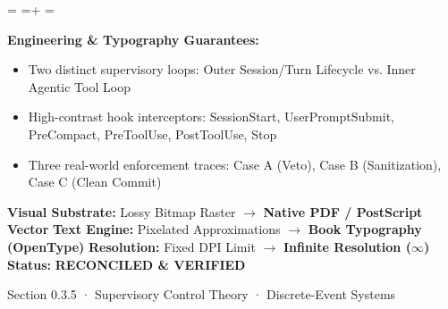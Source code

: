 \documentclass[10pt,a4paper,landscape]{article}
\newcommand{\pdautoscale}[2]{%
  \pdmaxh=#1\relax
  \pdmaxw=#2\relax
  \sbox{\pdscaledbox}{\usebox{\pdfigbox}}%
  \pdcurh=\dimexpr\ht\pdscaledbox+\dp\pdscaledbox\relax
  \pdcurw=\wd\pdscaledbox
  \ifdim\dimexpr\pdcurw * 100 / \pdmaxw\relax > \dimexpr\pdcurh * 100 / \pdmaxh\relax
    \resizebox{\pdmaxw}{!}{\usebox{\pdscaledbox}}%
  \else
    \resizebox{!}{\pdmaxh}{\usebox{\pdscaledbox}}%
  \fi
}
\begin{document}
\begin{minipage}[t]{0.492\linewidth}
  \begin{tcolorbox}[
    colback=pdcobalt!3,colframe=pdcobalt!85!black,arc=1.5pt,
    boxrule=0.7pt,top=1.5pt,bottom=1.5pt,left=4pt,right=4pt,
    title={\pdgrotesk\footnotesize\bfseries \color{white} B. Authoritative Native Vector Replacement \hfill \texttt{.tex / TikZ / PGF}}
  ]
    \begin{minipage}[c][8.3cm][c]{\linewidth}
      \centering
      \sbox{\pdfigbox}{}
      \pdautoscale{8.0cm}{\linewidth}
    \end{minipage}
    \tcblower
    \begin{minipage}[t][2.0cm][t]{\linewidth}
      \pdgrotesk\scriptsize
      \textbf{{\color{pdcobalt} Engineering \& Typography Guarantees:}}\\
      \begin{itemize}[leftmargin=9pt,itemsep=0pt,topsep=0.5pt,parsep=0pt]
        \item Two distinct supervisory loops: Outer Session/Turn Lifecycle vs. Inner Agentic Tool Loop
        \item High-contrast hook interceptors: SessionStart, UserPromptSubmit, PreCompact, PreToolUse, PostToolUse, Stop
        \item Three real-world enforcement traces: Case A (Veto), Case B (Sanitization), Case C (Clean Commit)
      \end{itemize}
    \end{minipage}
  \end{tcolorbox}
\end{minipage}

\vspace*{0.05cm}
\noindent
\begin{tcolorbox}[
  colback=hhpaper,colframe=hhgray!35,arc=1.5pt,boxrule=0.4pt,
  top=1.5pt,bottom=1.5pt,left=6pt,right=6pt
]
  \pdgrotesk\scriptsize
  \noindent
  \textbf{Visual Substrate:} Lossy Bitmap Raster $\rightarrow$ \textbf{\color{pdcobalt}Native PDF / PostScript Vector}\hfill
  \textbf{Text Engine:} Pixelated Approximations $\rightarrow$ \textbf{\color{pdcobalt}Book Typography (OpenType)}\hfill
  \textbf{Resolution:} Fixed DPI Limit $\rightarrow$ \textbf{\color{pdcobalt}Infinite Resolution ($\infty$)}\hfill
  \textbf{Status:} \textbf{\color{pdteal}RECONCILED \& VERIFIED}
\end{tcolorbox}
\clearpage

\noindent
\begin{minipage}[t]{\linewidth}
  \hfill
  {\pdgrotesk\footnotesize\color{hhgray} Section 0.3.5 · Supervisory Control Theory · Discrete-Event Systems}\\
  \vspace*{0.03cm}
  \noindent{\color{hhgray!40}\rule{\linewidth}{0.5pt}}
\end{minipage}
\end{document}

